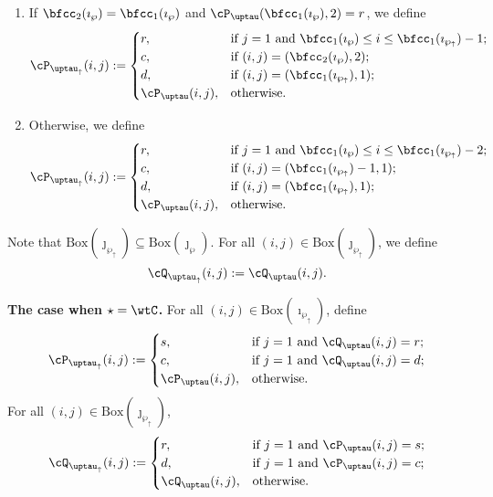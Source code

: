 \documentclass[12pt]{amsart}
\numberwithin{equation}{section}
\theoremstyle{remark}
\def\BOX#1{\mathrm{Box}(#1)}
\def\PBPs{\mathsf{PBP}_{\star}}
\def\wpu{\wp_{\uparrow}}
\def\wpd{\wp} %
\def\uptauu{\uptau_{\uparrow}}
\def\uptaud{\uptau} %
\def\PPm{\wp_{\downarrow}}
\def\uptaum{\uptau_{\downarrow}}
\begin{document}
\begin{enumerate}[label=(\alph*)]
\begin{enumerate}[label={\localtextbulletone}]
     \item If $\bfcc_{2}(\imath_{\wpd}) = \bfcc_{1}(\imath_{\wpd})$
     and
     $\cP_{\uptaud}(\bfcc_{1}(\imath_{\wpd}),2) = r$,
     we define
     \[
       \cP_{\uptauu}(i,j) := \begin{cases}
         r ,& \text{if $j=1$ and $\bfcc_{1}(\imath_{\wpd})\leq i \leq \bfcc_{1}(\imath_{\wpu})-1$};\\
         c ,& \text{if $(i,j)=(\bfcc_{2}(\imath_{\wpd}),2)$};\\
         d ,& \text{if $(i,j)=(\bfcc_{1}(\imath_{\wpu}),1)$};\\
         \cP_{\uptaud}(i,j) ,&\text{otherwise}.
       \end{cases}
     \]
     \item Otherwise, we define
     \[
       \cP_{\uptauu}(i,j) := \begin{cases}
         r ,& \text{if $j=1$ and $\bfcc_{1}(\imath_{\wpd})\leq i \leq \bfcc_{1}(\imath_{\wpu})-2$};\\
         c ,& \text{if $(i,j)=(\bfcc_{1}(\imath_{\wpu})-1,1)$};\\
         d ,& \text{if $(i,j)=(\bfcc_{1}(\imath_{\wpu}),1)$};\\
         \cP_{\uptaud}(i,j) ,&\text{otherwise}.
       \end{cases}
     \]
   \end{enumerate}
 \end{enumerate}

Note that $\BOX{\jmath_{\wpu}}\subseteq \BOX{\jmath_{\wp}}$.   For all $(i,j)\in \BOX{\jmath_{\wpu}}$, we define
   \[
     \cQ_{\uptauu}(i,j) := \cQ_{\uptau}(i,j).
   \]

\medskip
{\bfseries The case when $\star = \wtC$.} %
  For all $(i,j)\in \BOX{\imath_{\wpu}}$, define
  \begin{equation} \label{eq:T.M1}
     \cP_{\uptauu}(i,j) :=
     \begin{cases}
       s,& \text{if $j=1$ and  $\cQ_{\uptau}(i,j)=r$;}\\
       c,& \text{if $j=1$ and  $\cQ_{\uptau}(i,j)=d$;}\\
       \cP_{\uptau}(i,j), &\text{otherwise.}
     \end{cases}
   \end{equation}
  For all $(i,j)\in \BOX{\jmath_{\wpu}}$,
  \begin{equation} \label{eq:T.M2}
    \cQ_{\uptauu}(i,j) :=
    \begin{cases}
      r,& \text{if $j=1$ and  $\cP_{\uptau}(i,j)=s$;}\\
      d,& \text{if $j=1$ and  $\cP_{\uptau}(i,j)=c$;}\\
      \cQ_{\uptau}(i,j), &\text{otherwise.}
    \end{cases}
  \end{equation}
\end{document}
